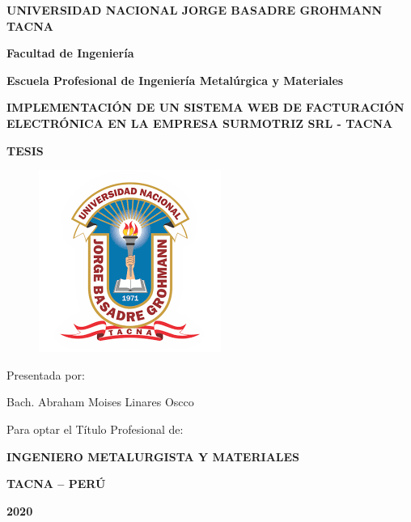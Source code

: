 \begin{titlepage}
    \begin{center}
        \LARGE{ \textbf{UNIVERSIDAD NACIONAL JORGE BASADRE GROHMANN TACNA}}\\
        \vspace{5mm}

        \large{ \textbf{Facultad de Ingeniería}} \\
        \vspace{5mm}

        \large{ \textbf{Escuela Profesional de Ingeniería Metalúrgica y Materiales}}\\
        \vspace{7mm}

        \large{}{ \textbf{IMPLEMENTACIÓN DE UN SISTEMA WEB DE FACTURACIÓN ELECTRÓNICA EN LA EMPRESA SURMOTRIZ SRL - TACNA}}\\
        \vspace{8mm}

        \LARGE{ \textbf{TESIS}}\\        
        
        \begin{figure}[h]
            \centering    
            \includegraphics[scale=1]{images/unjbg.png}
        \end{figure}

        \large{Presentada por:}\\
        \vspace{7mm}

        \large{ Bach. Abraham Moises Linares Oscco} \\
        \vspace{7mm}

        \large{ Para optar el Título Profesional de:} \\
        \vspace{7mm}

        \large{}{ \textbf{INGENIERO METALURGISTA Y MATERIALES}}\\
        \vspace{8mm}

        \large{}{ \textbf{TACNA – PERÚ}}\\
        \vspace{5mm}

        \large{}{ \textbf{2020}}\\        

    \end{center}
\end{titlepage}
